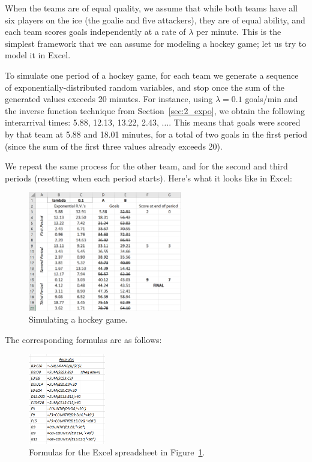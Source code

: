 When the teams are of equal quality, we assume that while both teams have all six players on the ice (the goalie and five attackers), 
they are of equal ability, and each team scores goals independently at a rate of $\lambda$ per minute.  
This is the simplest framework that we can assume for modeling a hockey game; let us try to model it in Excel.

To simulate one period of a hockey game, for each team we generate a sequence of exponentially-distributed random variables, and stop once the sum of the generated values exceeds 20 minutes.
For instance, using $\lambda = 0.1$ goals/min and the inverse function technique from Section~\ref{sec:2_expo}, we obtain the following interarrival times: 5.88, 12.13, 13.22, 2.43, $\ldots$.
This means that goals were scored by that team at 5.88 and 18.01 minutes, for a total of two goals in the first period (since the sum of the first three values already exceeds 20).

We repeat the same process for the other team, and for the second and third periods (resetting when each period starts).
Here's what it looks like in Excel:

\begin{figure}[htbp]
	\centering
	\includegraphics[width=0.6\textwidth]{fig/4_hockey1.png}
	\caption{Simulating a hockey game. \label{fig:4_hockey1}}
\end{figure}

The corresponding formulas are as follows:

\begin{figure}[htbp]
	\centering
	\includegraphics[width=0.3\textwidth]{fig/4_hockeyformulas.png}
	\caption{Formulas for the Excel spreadsheet in Figure~\ref{fig:4_hockey1}. \label{fig:4_hockeyformulas}}
\end{figure}

